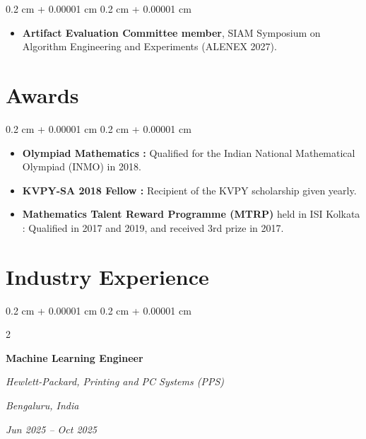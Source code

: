 \documentclass[10pt, letterpaper]{article}
\newenvironment{highlights}{
    \begin{itemize}[
        topsep=0.10 cm,
        parsep=0.10 cm,
        partopsep=0pt,
        itemsep=0pt,
        leftmargin=0.4 cm + 10pt
    ]
}{
    \end{itemize}
} %
\newenvironment{onecolentry}{
    \begin{adjustwidth}{
        0.2 cm + 0.00001 cm
    }{
        0.2 cm + 0.00001 cm
    }
}{
    \end{adjustwidth}
} %
\newenvironment{twocolentry}[2][]{
    \onecolentry
    \def\secondColumn{#2}
    \setcolumnwidth{\fill, 6.5 cm}
    \begin{paracol}{2}
}{
    \switchcolumn \raggedleft \secondColumn
    \end{paracol}
    \endonecolentry
} %
\begin{document}
    \begin{onecolentry}
        \begin{highlights}
            \item \textbf{Artifact Evaluation Committee member}, SIAM Symposium on Algorithm Engineering and Experiments (ALENEX 2027).
        \end{highlights}
    \end{onecolentry}

    \section{Awards}

    \begin{onecolentry}
        \begin{highlights}
            \item \textbf{Olympiad Mathematics :} Qualified for the Indian National Mathematical Olympiad (INMO) in 2018.
            \item \textbf{KVPY-SA 2018 Fellow :} Recipient of the KVPY scholarship given yearly. 
            \item \textbf{Mathematics Talent Reward Programme (MTRP)} held in ISI Kolkata : Qualified in 2017 and 2019, and received 3rd prize in 2017. 
        \end{highlights}
    \end{onecolentry}


    \section{Industry Experience}

        \begin{twocolentry}{
        \textit{Bengaluru, India}    
            
        \textit{Jun 2025 – Oct 2025}}
            \textbf{Machine Learning Engineer}
            
            \textit{Hewlett-Packard, Printing and PC Systems (PPS)}
        \end{twocolentry}
\end{document}
